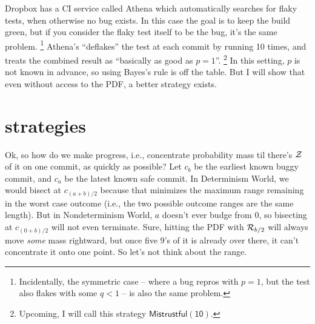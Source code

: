 \documentclass[11pt]{sigplanconf}
\begin{document}
Dropbox has a CI service called Athena \cite{athena}
which automatically searches for flaky tests, when otherwise no bug exists.
In this case the goal is to keep the build green, but if you consider the flaky test itself to be the bug, it's the same problem.%
\footnote{Incidentally, the symmetric case
-- where a bug repros with $p=1$, but the test also flakes with some $q<1$ --
is also the same problem.}
Athena's ``deflakes'' the test at each commit by running 10 times,
and treats the combined result as ``basically as good as $p=1$''.%
\footnote{Upcoming, I will call this strategy $\mathsf{Mistrustful(10)}$.}
In this setting, $p$ is not known in advance, so using Bayes's rule is off the table.
But I will show that even without access to the PDF, a better strategy exists. %


\section{strategies}

Ok, so how do we
make progress,
i.e., concentrate probability mass til there's $\mathcal{Z}$ of it on one commit,
as quickly as possible?
%
Let $c_b$ be the earliest known buggy commit, and $c_a$ be the latest known safe commit.
In Determinism World, we would bisect at $c_{(a+b)/2}$
because that minimizes the maximum range remaining in the worst case outcome
(i.e., the two possible outcome ranges are the same length).
But in Nondeterminism World, $a$ doesn't ever budge from $0$,
so bisecting at $c_{(0+b)/2}$ will not even terminate.
Sure, hitting the PDF with
$\mathcal{R}_{b/2}$
will always move {\it some} mass rightward,
but once five 9's of it is already over there,
it can't concentrate it onto one point.
So let's not think about the range.
\end{document}

